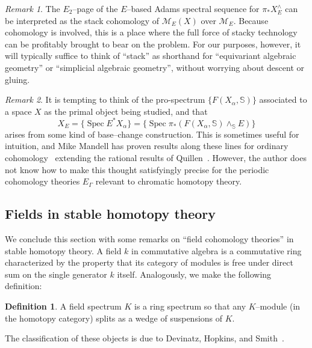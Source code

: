 \documentclass{amsart}
\renewcommand{\S}{\mathbb S}
\newcommand{\<}{\langle}
\renewcommand{\>}{\rangle}
\newcommand{\sm}{\wedge}
\newcommand{\sheaf}[1]{\mathcal{#1}}
\DeclareMathOperator{\Spec}{Spec}
\theoremstyle{plain}
\theoremstyle{definition}
\newtheorem*{definition}{Definition}
\theoremstyle{remark}
\newtheorem*{remark}{Remark}
\begin{document}
\begin{remark}\label{AdamsSSeqAndStackCoh}
The $E_2$--page of the $E$--based Adams spectral sequence for $\pi_* X^\wedge_E$ can be interpreted as the stack cohomology of $\sheaf{M}_E(X)$ over $\sheaf{M}_E$.  Because cohomology is involved, this is a place where the full force of stacky technology can be profitably brought to bear on the problem.  For our purposes, however, it will typically suffice to think of ``stack'' as shorthand for ``equivariant algebraic geometry'' or ``simplicial algebraic geometry'', without worrying about descent or gluing.
\end{remark}

\begin{remark}\label{DeeperBaseRemark}
It is tempting to think of the pro-spectrum $\{F(X_\alpha, \S)\}$ associated to a space $X$ as the primal object being studied, and that \[X_E = \{\Spec E^* X_\alpha\} = \{\Spec \pi_* (F(X_\alpha, \S) \sm_{\S} E)\}\] arises from some kind of base--change construction.  This is sometimes useful for intuition, and Mike Mandell has proven results along these lines for ordinary cohomology~\cite{MandellHZCochains,MandellHFpCochains} extending the rational results of Quillen~\cite{QuillenRational}.  However, the author does not know how to make this thought satisfyingly precise for the periodic cohomology theories $E_\Gamma$ relevant to chromatic homotopy theory.
\end{remark}



\subsection{Fields in stable homotopy theory}

We conclude this section with some remarks on ``field cohomology theories'' in stable homotopy theory.  A field $k$ in commutative algebra is a commutative ring characterized by the property that its category of modules is free under direct sum on the single generator $k$ itself.  Analogously, we make the following definition:

\begin{definition}
A field spectrum $K$ is a ring spectrum so that any $K$--module (in the homotopy category) splits as a wedge of suspensions of $K$.
\end{definition}

The classification of these objects is due to Devinatz, Hopkins, and Smith~\cite{HopkinsSmith}.
\end{document}
